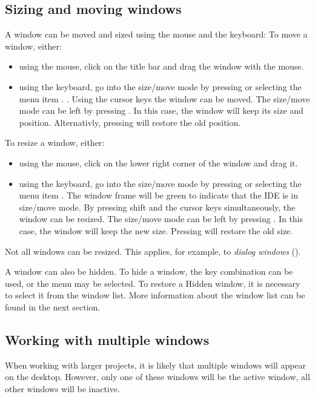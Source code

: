 \subsection{Sizing and moving windows}
\label{se:windowsizingmoving}
A window can be moved and sized using the mouse and the keyboard:
To move a window, either:
\begin{itemize}
\item using the mouse, click on the title bar and drag the window 
with the mouse.
\item using the keyboard, go into the size/move mode
by pressing  or selecting the menu item
. . Using the cursor keys the window can be moved. 
The size/move mode can be left by pressing . 
In this case, the window will keep its size and position. 
Alternativly, pressing  will restore the old position.
\end{itemize} 
To resize a window, either:
\begin{itemize}
\item using the mouse, click on the lower right corner of the window
and drag it.
\item using the keyboard, go into the size/move mode
by pressing  or selecting the menu item
. The window frame will be green to indicate that
the IDE is in size/move mode. 
By pressing shift and the cursor keys simultaneously, the window can 
be resized.  The size/move mode can be left by pressing
. In this case, the window will keep the new size.
Pressing  will restore the old size.
\end{itemize}
Not all windows can be resized. This applies, for example, to
\emph{dialog windows} ().

A window can also be hidden. To hide a window, the  key
combination can be used, or the  menu may be selected.
To restore a Hidden window, it is necessary to select it from the window
list. More information about the window list can be found in the next
section.   
%
%
\subsection{Working with multiple windows}
\label{se:multiplewindows}
When working with larger projects, it is likely that multiple windows 
will appear on the desktop. However, only one of these windows will be 
the active window, all other windows will be inactive.

